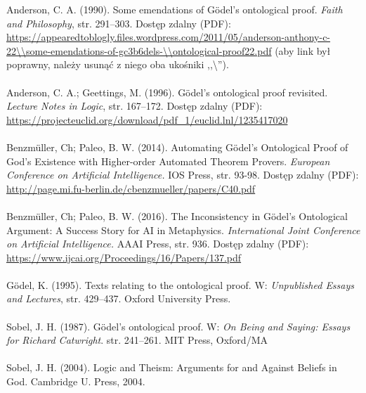 \documentclass[
    showauthor=true,   %
    showsubject=false, %
    showdate=true,     %
    hyphenation=true   %
]{src/wut-report}
\begin{document}
\noindent [Anderson, 1990] Anderson, C. A. (1990). Some emendations of G\"odel’s ontological proof. \textit{Faith and Philosophy}, str. 291–303. Dostęp zdalny (PDF): \url{https://appearedtoblogly.files.wordpress.com/2011/05/anderson-anthony-c-22\\some-emendations-of-gc3b6dels-\\ontological-proof22.pdf} (aby link był poprawny, należy usunąć z niego oba ukośniki ,,\textbackslash'').
\\ \\
\noindent [Anderson, 1996] Anderson, C. A.; Geettings, M. (1996). G\"odel’s ontological proof revisited. \textit{Lecture Notes in Logic}, str. 167–172. Dostęp zdalny (PDF): \url{https://projecteuclid.org/download/pdf_1/euclid.lnl/1235417020}
\\ \\
 Benzm\"uller, Ch; Paleo, B. W. (2014). Automating G\"odel’s Ontological Proof of God’s Existence with Higher-order Automated Theorem Provers. \textit{European Conference on Artificial Intelligence.} IOS Press, str. 93-98. Dostęp zdalny (PDF): \url{http://page.mi.fu-berlin.de/cbenzmueller/papers/C40.pdf}
\\ \\
 Benzm\"uller, Ch; Paleo, B. W. (2016). The Inconsistency in G\"odel's Ontological Argument: A Success Story for AI in Metaphysics. \textit{International Joint Conference on Artificial Intelligence.} AAAI Press, str. 936. Dostęp zdalny (PDF): \url{https://www.ijcai.org/Proceedings/16/Papers/137.pdf}
\\ \\
\noindent [G\"odel, 1995] G\"odel, K. (1995). Texts relating to the ontological proof. W: \textit{Unpublished Essays and Lectures}, str. 429–437. Oxford University Press.
\\ \\
\noindent [Sobel, 1987] Sobel, J. H. (1987). G\"odel’s ontological proof. W: \textit{On Being and Saying: Essays for Richard Catwright}. str. 241–261. MIT Press, Oxford/MA
\\ \\
\noindent [Sobel, 2004] Sobel, J. H. (2004). Logic and Theism: Arguments for and Against Beliefs in God. Cambridge U. Press, 2004.
\end{document}
